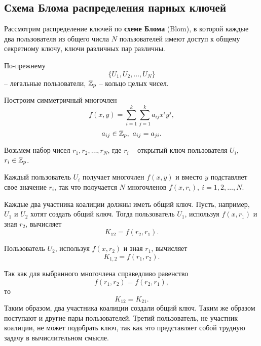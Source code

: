 \subsection{Схема Блома распределения парных ключей}

Рассмотрим распределение ключей по \textbf{схеме Блома} (Blom), в которой каждые два пользователя из общего числа $N$ пользователей имеют доступ к общему секретному ключу, ключи различных пар различны.

По-прежнему
    \[ \{ U_1, U_2, \dots, U_N \} \]
-- легальные пользователи, $\mathbb{Z}_p$ -- кольцо целых чисел.

Построим симметричный многочлен
    \[ f(x,y) = \sum_{i=1}^k \sum_{j=1}^k a_{ij} x^i y^j, \]
    \[ a_{ij} \in \mathbb{Z}_p, ~ a_{ij} = a_{ji}. \]

Возьмем набор чисел $r_1, r_2, \dots, r_N$, где $r_i$ -- открытый ключ пользователя $U_i$, ~ $r_i \in \mathbb{Z}_p$.

Каждый пользователь $U_i$ получает многочлен $f(x,y)$ и вместо $y$ подставляет свое значение $r_i$, так что получается $N$ многочленов $f(x, r_i), ~ i = 1, 2, \dots, N$.

Каждые два участника коалиции должны иметь общий ключ. Пусть, например, $U_1$ и $U_2$ хотят создать общий ключ. Тогда пользователь $U_1$, используя $f(x, r_1)$ и зная $r_2$, вычисляет
    \[ K_{12} = f(r_2, r_1). \]

Пользователь $U_2$, используя $f(x, r_2)$ и зная $r_1$, вычисляет
    \[ K_{1,2} = f(r_1, r_2). \]

Так как для выбранного многочлена справедливо равенство
    \[ f(r_1, r_2) = f(r_2, r_1), \]
то
    \[ K_{12} = K_{21}. \]
Таким образом, два участника коалиции создали общий ключ. Таким же образом поступают и другие пары пользователей. Третий пользователь, не участник коалиции, не может подобрать ключ, так как это представляет собой трудную задачу в вычислительном смысле.

